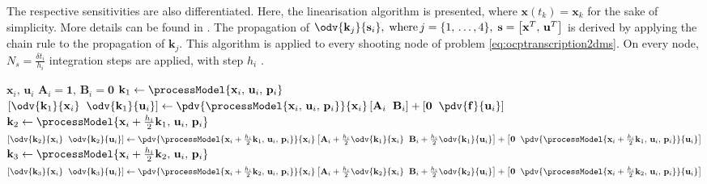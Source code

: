 The respective sensitivities are also differentiated. Here, the linearisation algorithm  is presented, where $\mathbf{x}(t_k) = \mathbf{x}_k$ for the sake of simplicity. More details can be found in \cite{gros2020linear}. The propagation of $\odv{\mathbf{k}_j}{\mathbf{s}_i},\; \text{where} \, j = \{1,\,\ldots,4\},\; \mathbf{s}=\left[\mathbf{x}^T,\,\mathbf{u}^T\right]$ is derived by applying the chain rule to the propagation of $\mathbf{k}_j$. This algorithm is applied to every shooting node of problem \eqref{eq:ocptranscription2dms}. On every node, $N_s = \frac{\delta t_i}{h_i}$ integration steps are applied, with step $h_i$ \cite{gros2020linear}.

\begin{algorithm}[H]
	\caption{RK4fAD}\label{alg:rk4ad}
	\centering
	\footnotesize
	\begin{algorithmic}[1]
	\Require $\mathbf{x}_i,\,\mathbf{u}_i$
	\State $\mathbf{A}_i = \mathbf{1},\,\mathbf{B}_i = \mathbf{0}$
	\State $\mathbf{k}_1 \gets \processModel{\mathbf{x}_i,\, \mathbf{u}_i,\, \mathbf{p}_i}$
	\State $\left[\odv{\mathbf{k}_1}{\mathbf{x}_i} \hspace{0.2cm} \odv{\mathbf{k}_1}{\mathbf{u}_i}\right] \gets \pdv{\processModel{\mathbf{x}_i,\, \mathbf{u}_i,\, \mathbf{p}_i}}{\mathbf{x}_i} \left[\mathbf{A}_i \hspace{0.2cm} \mathbf{B}_i\right] + \left[\mathbf{0} \hspace{0.2cm} \pdv{\mathbf{f}}{\mathbf{u}_i}\right]$
	\State $\mathbf{k}_2 \gets \processModel{\mathbf{x}_i + \frac{h_i}{2}\mathbf{k}_1,\,\mathbf{u}_i,\,\mathbf{p}_i}$
	\State $\left[\odv{\mathbf{k}_2}{\mathbf{x}_i} \hspace{0.2cm} \odv{\mathbf{k}_2}{\mathbf{u}_i}\right] \gets \pdv{\processModel{\mathbf{x}_i + \frac{h_i}{2}\mathbf{k}_1,\,\mathbf{u}_i,\,\mathbf{p}_i}}{\mathbf{x}_i} \left[\mathbf{A}_i + \frac{h_i}{2} \odv{\mathbf{k}_1}{\mathbf{x}_i} \hspace{0.2cm} \mathbf{B}_i + \frac{h_i}{2} \odv{\mathbf{k}_1}{\mathbf{u}_i}\right] + \left[\mathbf{0} \hspace{0.2cm} \pdv{\processModel{\mathbf{x}_i + \frac{h_i}{2}\mathbf{k}_1,\,\mathbf{u}_i,\,\mathbf{p}_i}}{\mathbf{u}_i}\right]$
	\State $\mathbf{k}_3 \gets \processModel{\mathbf{x}_i + \frac{h_i}{2}\mathbf{k}_2,\, \mathbf{u}_i,\, \mathbf{p}_i}$
	\State $\left[\odv{\mathbf{k}_3}{\mathbf{x}_i} \hspace{0.2cm} \odv{\mathbf{k}_3}{\mathbf{u}_i}\right] \gets \pdv{\processModel{\mathbf{x}_i + \frac{h_i}{2}\mathbf{k}_2,\,\mathbf{u}_i,\,\mathbf{p}_i}}{\mathbf{x}_i} \left[\mathbf{A}_i + \frac{h_i}{2} \odv{\mathbf{k}_2}{\mathbf{x}_i} \hspace{0.2cm} \mathbf{B}_i + \frac{h_i}{2} \odv{\mathbf{k}_2}{\mathbf{u}_i}\right] + \left[\mathbf{0} \hspace{0.2cm} \pdv{\processModel{\mathbf{x}_i + \frac{h_i}{2}\mathbf{k}_2,\,\mathbf{u}_i,\,\mathbf{p}_i}}{\mathbf{u}_i}\right]$

\end{algorithmic}
\end{algorithm}
